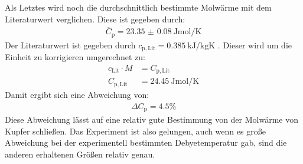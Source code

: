 \noindent Als Letztes wird noch die durchschnittlich bestimmte Molwärme mit dem Literaturwert verglichen. Diese ist gegeben durch:
\begin{align*}
  \overline{C}_\mathrm{p}=\SI{23.35(8)}{\joule\mole\per\kelvin}
\end{align*}
Der Literaturwert ist gegeben durch $c_\mathrm{p,Lit}=\SI{0.385}{\kilo\joule\per\kilo\gram\kelvin}$ \cite{Anleitung7}. Dieser wird um die Einheit zu korrigieren umgerechnet zu:
\begin{align*}
  c_\mathrm{Lit}\cdot M &= C_\mathrm{p,Lit} \\
  C_\mathrm{p,Lit} &= \SI{24.45}{\joule\mole\per\kelvin}
\end{align*}
Damit ergibt sich eine Abweichung von:
\begin{align*}
  \Delta C_\mathrm{p} = 4.5\%
\end{align*}
Diese Abweichung lässt auf eine relativ gute Bestimmung von der Molwärme von Kupfer schließen. Das Experiment ist also gelungen, auch wenn es große Abweichung bei der experimentell bestimmten
Debyetemperatur gab, sind die anderen erhaltenen Größen relativ genau.
